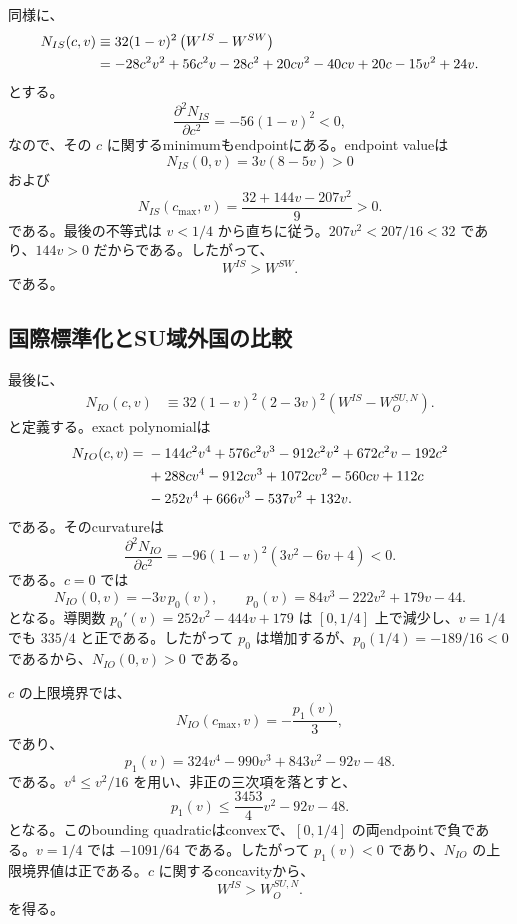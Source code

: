 同様に、
\begin{align}
N_{IS}(c,v)
&\equiv 32(1-v)^2\left(W^{IS}-W^{SW}\right)\notag\\
&=-28c^2v^2+56c^2v-28c^2
+20cv^2-40cv+20c
-15v^2+24v.
\label{eq:appendix-n-is}
\end{align}
とする。
\[
\frac{\partial^2N_{IS}}{\partial c^2}
=-56(1-v)^2<0,
\]
なので、その $c$ に関するminimumもendpointにある。endpoint valueは
\[
N_{IS}(0,v)=3v(8-5v)>0
\]
および
\[
N_{IS}(c_{\max},v)
=\frac{32+144v-207v^2}{9}>0.
\]
である。最後の不等式は $v<1/4$ から直ちに従う。$207v^2<207/16<32$ であり、$144v>0$ だからである。したがって、
\begin{equation}
\boxed{W^{IS}>W^{SW}.}
\label{eq:appendix-is-gt-sw}
\end{equation}
である。

\subsection{国際標準化とSU域外国の比較}

最後に、
\begin{align}
N_{IO}(c,v)
&\equiv 32(1-v)^2(2-3v)^2
\left(W^{IS}-W_O^{SU,N}\right).
\label{eq:appendix-n-io-definition}
\end{align}
と定義する。exact polynomialは
\begin{align}
N_{IO}(c,v)
={}&-144c^2v^4+576c^2v^3-912c^2v^2+672c^2v-192c^2\notag\\
&+288cv^4-912cv^3+1072cv^2-560cv+112c\notag\\
&-252v^4+666v^3-537v^2+132v.
\label{eq:appendix-n-io}
\end{align}
である。そのcurvatureは
\[
\frac{\partial^2N_{IO}}{\partial c^2}
=-96(1-v)^2(3v^2-6v+4)<0.
\]
である。$c=0$ では
\[
N_{IO}(0,v)
=-3v\,p_0(v),
\qquad
p_0(v)=84v^3-222v^2+179v-44.
\]
となる。導関数 $p_0'(v)=252v^2-444v+179$ は $[0,1/4]$ 上で減少し、$v=1/4$ でも $335/4$ と正である。したがって $p_0$ は増加するが、$p_0(1/4)=-189/16<0$ であるから、$N_{IO}(0,v)>0$ である。

$c$ の上限境界では、
\[
N_{IO}(c_{\max},v)
=-\frac{p_1(v)}{3},
\]
であり、
\[
p_1(v)=324v^4-990v^3+843v^2-92v-48.
\]
である。$v^4\le v^2/16$ を用い、非正の三次項を落とすと、
\[
p_1(v)
\le \frac{3453}{4}v^2-92v-48.
\]
となる。このbounding quadraticはconvexで、$[0,1/4]$ の両endpointで負である。$v=1/4$ では $-1091/64$ である。したがって $p_1(v)<0$ であり、$N_{IO}$ の上限境界値は正である。$c$ に関するconcavityから、
\begin{equation}
\boxed{W^{IS}>W_O^{SU,N}.}
\label{eq:appendix-is-gt-su-outsider}
\end{equation}
を得る。

